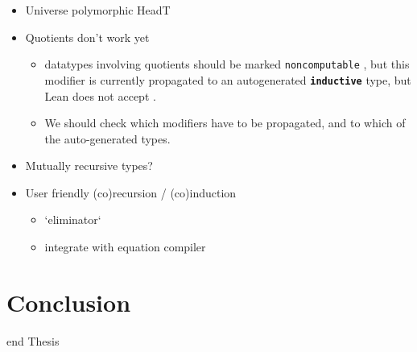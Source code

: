 \documentclass[titlepage]{report}
\newenvironment{todo}{%
\definecolor{shadecolor}{HTML}{F8E0E0}%
\begin{shaded}%
\begin{trivlist}                         
    \item[\hskip \labelsep {\bfseries Todo:}]}{\end{trivlist}\end{shaded}}
\newenvironment{leanhidden}{\expandafter\comment}{\expandafter\endcomment}
\newcommand\lean[1]{{%
\def\leanmode{1}%
\small \texttt{#1}%
\undef\leanmode%
}}
\newcommand\keyword[1]{{\color{keywordcolor} \textbf{\lean{#1}}}}
\newcommand\inductive{{\keyword{inductive}}}
\begin{document}
\begin{todo}
    


    \begin{itemize}
        \item Universe polymorphic HeadT
        
        \item Quotients don't work yet
              \begin{itemize}
                \item datatypes involving quotients should be marked \lean{noncomputable}, but this modifier is currently propagated to an autogenerated \inductive{} type, but Lean does not accept .

                \item We should check which modifiers have to be propagated, and to which of the auto-generated types.
              \end{itemize}
        

        \item Mutually recursive types?
        
        \item User friendly (co)recursion / (co)induction
                \begin{itemize}
                    \item `eliminator`
                    \item integrate with equation compiler
                \end{itemize}
    \end{itemize}
\end{todo}









\chapter{Conclusion}
\label{ch:conclusion}















\begin{leanhidden}
    end Thesis
\end{leanhidden}





\end{document}

